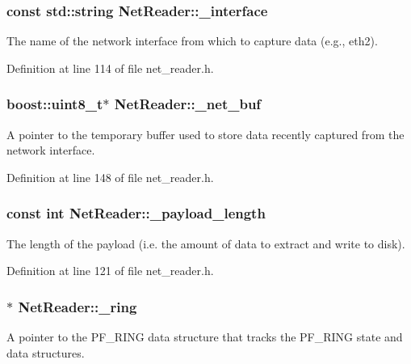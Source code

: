 \hypertarget{class_net_reader_adcf200863f3126eaaa825d66de3b2ae6}{
\subsubsection[{\_\-interface}]{\setlength{\rightskip}{0pt plus 5cm}const std::string {\bf NetReader::\_\-interface}}}
\label{class_net_reader_adcf200863f3126eaaa825d66de3b2ae6}
The name of the network interface from which to capture data (e.g., eth2). 

Definition at line 114 of file net\_\-reader.h.

\hypertarget{class_net_reader_afc35b98235d4d5479f755765d6bb1c97}{
\subsubsection[{\_\-net\_\-buf}]{\setlength{\rightskip}{0pt plus 5cm}boost::uint8\_\-t$\ast$ {\bf NetReader::\_\-net\_\-buf}}}
\label{class_net_reader_afc35b98235d4d5479f755765d6bb1c97}
A pointer to the temporary buffer used to store data recently captured from the network interface. 

Definition at line 148 of file net\_\-reader.h.

\hypertarget{class_net_reader_aeee03720b22f775cdbee80a50c39453a}{
\subsubsection[{\_\-payload\_\-length}]{\setlength{\rightskip}{0pt plus 5cm}const int {\bf NetReader::\_\-payload\_\-length}}}
\label{class_net_reader_aeee03720b22f775cdbee80a50c39453a}
The length of the payload (i.e. the amount of data to extract and write to disk). 

Definition at line 121 of file net\_\-reader.h.

\hypertarget{class_net_reader_acf0a225f9ec8f89f3b3b1e9ff761d916}{
\subsubsection[{\_\-ring}]{$\ast$ {\bf NetReader::\_\-ring}}}
\label{class_net_reader_acf0a225f9ec8f89f3b3b1e9ff761d916}
A pointer to the PF\_\-RING data structure that tracks the PF\_\-RING state and data structures. 

